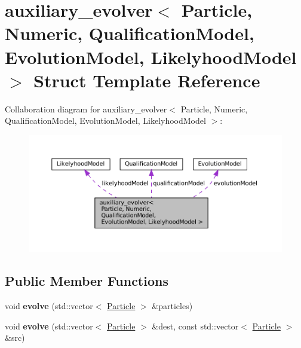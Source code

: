 \hypertarget{structauxiliary__evolver}{}\section{auxiliary\+\_\+evolver$<$ Particle, Numeric, Qualification\+Model, Evolution\+Model, Likelyhood\+Model $>$ Struct Template Reference}
\label{structauxiliary__evolver}


Collaboration diagram for auxiliary\+\_\+evolver$<$ Particle, Numeric, Qualification\+Model, Evolution\+Model, Likelyhood\+Model $>$\+:
\nopagebreak
\begin{figure}[H]
\begin{center}
\leavevmode
\includegraphics[width=350pt]{structauxiliary__evolver__coll__graph}
\end{center}
\end{figure}
\subsection*{Public Member Functions}
\begin{DoxyCompactItemize}
\item 
\mbox{\label{structauxiliary__evolver_a5b5b1faaebe2bbb3f625ca6ac1678257}} 
void {\bfseries evolve} (std\+::vector$<$ \hyperlink{structParticle}{Particle} $>$ \&particles)
\item 
\mbox{\label{structauxiliary__evolver_a162deb7efec81ab84491c51d5387cc6c}} 
void {\bfseries evolve} (std\+::vector$<$ \hyperlink{structParticle}{Particle} $>$ \&dest, const std\+::vector$<$ \hyperlink{structParticle}{Particle} $>$ \&src)
\end{DoxyCompactItemize}
